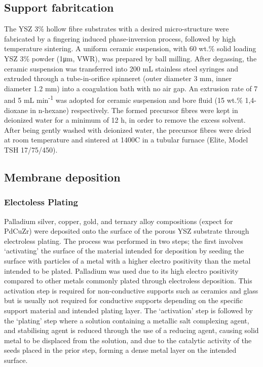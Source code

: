 \subsection{Support fabritcation}
The YSZ 3\% hollow fibre substrates with a desired micro-structure were fabricated by a fingering induced phase-inversion process, followed by high temperature sintering. A uniform ceramic suspension, with 60 wt.\% solid loading YSZ 3\% powder (1μm, VWR), was prepared by ball milling. After degassing, the ceramic suspension was transferred into 200 mL stainless steel syringes and extruded through a tube-in-orifice spinneret (outer diameter 3 mm, inner diameter 1.2 mm) into a coagulation bath with no air gap. An extrusion rate of 7 and 5 mL min\textsuperscript{-1} was adopted for ceramic suspension and bore fluid (15 wt.\% 1,4- dioxane in n-hexane) respectively. The formed precursor fibres were kept in deionized water for a minimum of 12 h, in order to remove the excess solvent. After being gently washed with deionized water, the precursor fibres were dried at room temperature and sintered at 1400\textdegree C in a tubular furnace (Elite, Model TSH 17/75/450).

\subsection{Membrane deposition}
\subsubsection{Electoless Plating}
Palladium silver, copper, gold, and ternary alloy compositions (expect for PdCuZr) were deposited onto the surface of the porous YSZ substrate through electroless plating. The process was performed in two steps; the first involves ‘activating’ the surface of the material intended for deposition by seeding the surface with particles of a metal with a 
higher electro positivity than the metal intended to be plated. Palladium was used due to its high electro positivity compared to other metals commonly plated through electroless deposition. This activation step is required for non-conductive supports such as ceramics and glass but is usually not required for conductive supports depending on the specific support material and intended plating layer. The ‘activation’ step is followed by the ‘plating’ step where a solution containing a metallic salt complexing agent, and stabilising agent is reduced through the use of a reducing agent, causing solid metal to be displaced from the 
solution, and due to the catalytic activity of the seeds placed in the prior step, forming a dense metal layer on the intended surface. 

